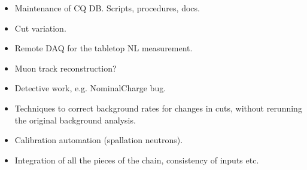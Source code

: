 \begin{itemize}
\item Maintenance of CQ DB. Scripts, procedures, docs.
\item Cut variation.
\item Remote DAQ for the tabletop NL measurement.
\item Muon track reconstruction?
\item Detective work, e.g. NominalCharge bug.
\item Techniques to correct background rates for changes in cuts, without rerunning the original background analysis.
\item Calibration automation (spallation neutrons).
\item Integration of all the pieces of the chain, consistency of inputs etc.
\end{itemize}